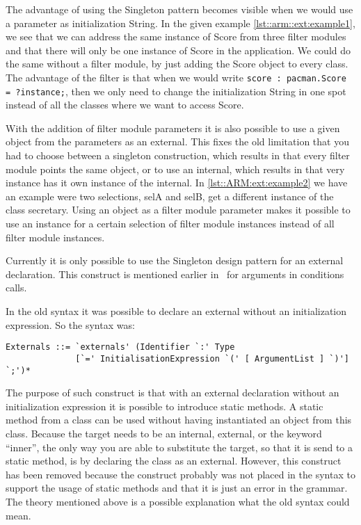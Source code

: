The advantage of using the Singleton pattern becomes visible when we would use a
parameter as initialization String. In the given example \autoref{lst::arm::ext:example1},
we see that we can address the same instance of Score from three filter modules and that there will only be one
instance of Score in the application. We could do the same without a filter module, by just
adding the Score object to every class. The advantage of the filter is that when we would write
\lstinline[breaklines=false]!score : pacman.Score = ?instance;!, then we only need to change the initialization String
in one spot instead of all the classes where we want to access Score.

With the addition of filter module parameters it is also possible to use a given object from the parameters as an
external. This fixes the old limitation that you had to choose between a singleton construction, which results in that
every filter module points the same object, or to use an internal, which results in that very instance has it own instance of the
internal. In \autoref{lst::ARM:ext:example2} we have an example were two selections, selA and selB, get a different 
instance of the class secretary. Using an object as a filter module parameter makes it possible to use an instance for
a certain selection of filter module instances instead of all filter module instances.

Currently it is only possible to use the Singleton design pattern for an external declaration. 
This construct is mentioned earlier in~\cite{Doornenbal2006}
for arguments in conditions calls.

In the old syntax it was possible to declare an external without an initialization expression. So the syntax was:
\begin{lstlisting}[style=listingWithNoNumbers,language=ebnf]
Externals ::= `externals' (Identifier `:' Type 
              [`=' InitialisationExpression `(' [ ArgumentList ] `)'] `;')*            
\end{lstlisting}

The purpose of such construct is that with an external declaration without an initialization expression it is possible to introduce static methods. A static method from a class can be used without having instantiated an object from this class.
Because the target needs to be an internal, external, or the keyword ``inner'', the only way you are able to substitute the target, so that it is send to a static method, is by declaring the class as an external.
However, this construct has been removed because the construct probably was not placed in the syntax to support the usage of static methods and that it is just an error in the grammar. The theory mentioned above is a possible explanation what the old syntax could mean.